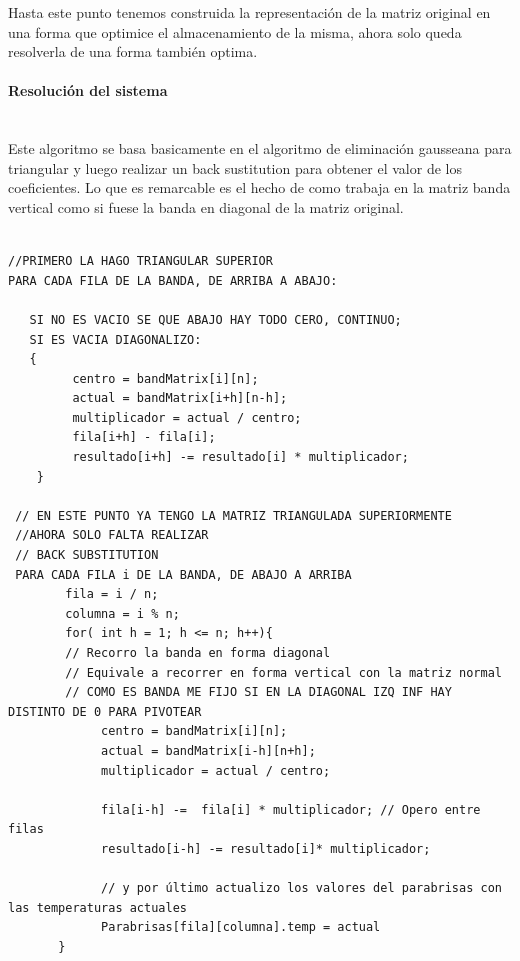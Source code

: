 Hasta este punto tenemos construida la representación de la matriz original en una forma que optimice el almacenamiento de la misma, ahora solo queda resolverla de una forma también optima.

\paragraph{Resolución del sistema} \mbox{}\\

Este algoritmo se basa basicamente en el algoritmo de eliminación gausseana para triangular y luego realizar un back sustitution para obtener el valor de los coeficientes.
Lo que es remarcable es el hecho de como trabaja en la matriz banda vertical como si fuese la banda en diagonal de la matriz original.
 
\begin{verbatim}

//PRIMERO LA HAGO TRIANGULAR SUPERIOR
PARA CADA FILA DE LA BANDA, DE ARRIBA A ABAJO:
		
   SI NO ES VACIO SE QUE ABAJO HAY TODO CERO, CONTINUO;
   SI ES VACIA DIAGONALIZO:
   {
         centro = bandMatrix[i][n];
         actual = bandMatrix[i+h][n-h];
         multiplicador = actual / centro;		
         fila[i+h] - fila[i];
         resultado[i+h] -= resultado[i] * multiplicador;
    }
   
 // EN ESTE PUNTO YA TENGO LA MATRIZ TRIANGULADA SUPERIORMENTE
 //AHORA SOLO FALTA REALIZAR
 // BACK SUBSTITUTION
 PARA CADA FILA i DE LA BANDA, DE ABAJO A ARRIBA
        fila = i / n;
        columna = i % n;
        for( int h = 1; h <= n; h++){ 
        // Recorro la banda en forma diagonal
        // Equivale a recorrer en forma vertical con la matriz normal
        // COMO ES BANDA ME FIJO SI EN LA DIAGONAL IZQ INF HAY DISTINTO DE 0 PARA PIVOTEAR
             centro = bandMatrix[i][n];
             actual = bandMatrix[i-h][n+h];           
             multiplicador = actual / centro;
		
             fila[i-h] -=  fila[i] * multiplicador; // Opero entre filas
             resultado[i-h] -= resultado[i]* multiplicador; 
                
             // y por último actualizo los valores del parabrisas con las temperaturas actuales             
             Parabrisas[fila][columna].temp = actual
       }
\end{verbatim}





